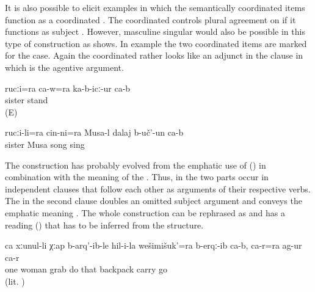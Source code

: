 It is also possible to elicit examples in which the semantically coordinated items function as a coordinated . The coordinated  controls plural agreement on  if it functions as subject . However, masculine singular would also be possible in this type of construction as  shows. In example  the two coordinated items are marked for the  case. Again the coordinated  rather looks like an adjunct in the clause in which  is the agentive argument.
%
\begin{exe}
	\ex	\label{ex:‎He and (his) sister were standing there}
	\gll	rucːi=ra	ca-w=ra	ka-b-icː-ur	ca-b\\
		sister		stand	\\
	\glt	{} (E)

	\ex	\label{ex:Musa sang a song together with his sister}
	\gll	rucːi-li=ra	cin-ni=ra	Musa-l	dalaj	b-uč'-un	ca-b\\
		sister		Musa	song	sing	\\
	\glt	{}
\end{exe}

The construction has probably evolved from the emphatic use of  () in combination with the  meaning of the  . Thus, in  the two parts occur in independent clauses that follow each other as arguments of their respective verbs. The  in the second clause doubles an omitted subject argument and conveys the emphatic meaning . The whole construction can be rephrased as  and has a  reading () that has to be inferred from the structure.
%
\begin{exe}
	\ex	\label{ex:There one woman grabbed his backpack, took it, and went away with it}
	\gll	ca	xːunul-li	χːap	b-arq'-ib-le	hil-i-la	wešimišuk'=ra b-erqː-ib	ca-b,	ca-r=ra	ag-ur	ca-r\\
		one	woman	grab	do	that	backpack carry			go	\\
	\glt	{} (lit. )
\end{exe}


